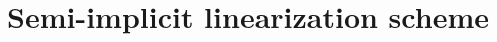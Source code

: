 \documentclass[cmbright]{mymmaauth}
\begin{document}
\section{Semi-implicit linearization scheme}
\end{document}
